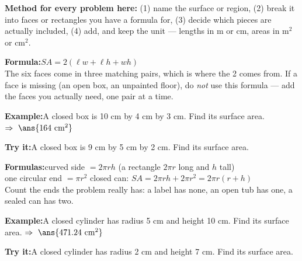 \documentclass[12pt]{article}
\begin{document}

\noindent\small\textbf{Method for every problem here:} (1) name the surface or region, (2) break
it into faces or rectangles you have a formula for, (3) decide which pieces are actually
included, (4) add, and keep the unit --- lengths in m or cm, areas in m$^2$ or cm$^2$.\normalsize

\begin{formulabox}\textbf{Formula:}\quad $SA = 2(\ell w + \ell h + wh)$\\[3pt]
The six faces come in three matching pairs, which is where the 2 comes from. If a face is
missing (an open box, an unpainted floor), do \emph{not} use this formula --- add the faces you
actually need, one pair at a time.
\end{formulabox}
\begin{examplebox}\textbf{Example:}\quad A closed box is 10 cm by 4 cm by 3 cm. Find its surface area.
$\Rightarrow\ \ans{164 \text{ cm}^2}$
\end{examplebox}
\begin{tryitbox}\textbf{Try it:}\quad A closed box is 9 cm by 5 cm by 2 cm. Find its surface area.\\[2pt]
\end{tryitbox}

\begin{formulabox}\textbf{Formulas:}\quad curved side $= 2\pi r h$ \quad(a rectangle
$2\pi r$ long and $h$ tall)\\[2pt]
one circular end $= \pi r^2$ \qquad closed can: $SA = 2\pi r h + 2\pi r^2 = 2\pi r(r + h)$\\[3pt]
Count the ends the problem really has: a label has none, an open tub has one, a sealed can has two.
\end{formulabox}
\begin{examplebox}\textbf{Example:}\quad A closed cylinder has radius 5 cm and height 10 cm. Find its surface area.
$\Rightarrow\ \ans{471.24 \text{ cm}^2}$
\end{examplebox}
\begin{tryitbox}\textbf{Try it:}\quad A closed cylinder has radius 2 cm and height 7 cm. Find its surface area.\\[2pt]
\end{tryitbox}
\end{document}
